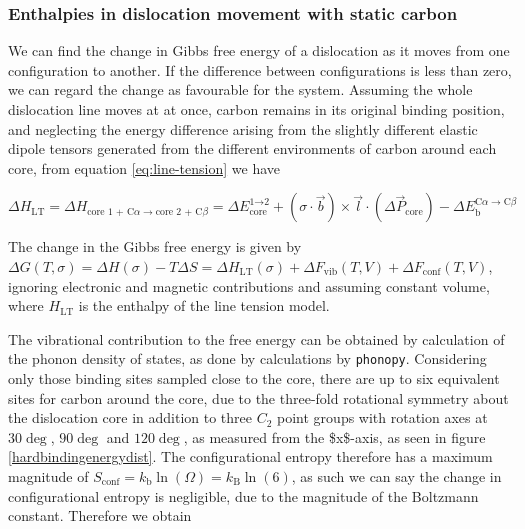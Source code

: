 \documentclass[a4paper,11pt]{article}
\begin{document}
\subsubsection{Enthalpies in dislocation movement with static carbon}
\label{sec:org3b0db7d}

We can find the change in Gibbs free energy of a dislocation as it moves from one configuration to
another. If the difference between configurations is less than zero, we can
regard the change as favourable for the system. Assuming the whole dislocation line moves at at once, carbon remains in its original
binding position, and neglecting the energy
difference arising from the slightly different elastic dipole tensors generated from the
different environments of carbon around each core, from equation \ref{eq:line-tension} we have


    \begin{equation}
\Delta H_{\text{LT} } =      \Delta H_{ \text{core 1 + C}\alpha \rightarrow \text{core 2 + C}\beta }
       =  \Delta E_{\text{core}}^{\text{1} \rightarrow \text{2}}
	   + (\sigma \cdot \vec{b}) \times \vec{l}  \cdot ( \Delta\vec{P}_{\text{core}} )
       - \Delta E_{\text{b}}^{\text{C}\alpha \rightarrow \text{C}\beta}
    \end{equation}


The change in the Gibbs free energy is given by  \(\Delta G(T,\sigma) = \Delta H(\sigma) -
    T\Delta S =
    \Delta H_{\text{LT}}(\sigma) + \Delta F_{\text{vib} }(T,V) + \Delta F_{\text{conf} }(T,V)\),
ignoring electronic and magnetic contributions and assuming constant volume, where \(H_{\text{LT} }\)
is the enthalpy of the line tension model.


The vibrational contribution to the free energy can be obtained by
calculation of the phonon density of states, as done by
calculations by \texttt{phonopy}. Considering only those binding sites sampled
close to the core, there are up to six equivalent sites for carbon around
the core, due to the three-fold rotational symmetry about the dislocation
core in addition to three \(C_2\) point groups with rotation axes at \(30\deg\), \(90\deg\)
and \(120\deg\), as measured from the \$x\$-axis, as seen in figure
\ref{hardbindingenergydist}. The configurational entropy
therefore has a maximum magnitude of \(S_{\text{conf} } =
    k_{\text{b} }\ln (\Omega) = k_{\text{B}} \ln(6)\), as such we can say the
change in configurational entropy is negligible, due to the magnitude of the
Boltzmann constant. Therefore we obtain
\end{document}
